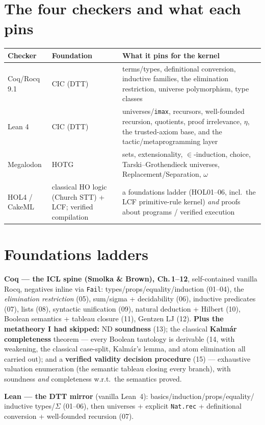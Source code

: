 \documentclass[11pt]{article}
\begin{document}
\section{The four checkers and what each pins}
\begin{center}\small
\begin{tabular}{@{}llp{6.4cm}@{}}
\toprule
Checker & Foundation & What it pins for the kernel \\
\midrule
Coq/Rocq 9.1 & CIC (DTT) & terms/types, definitional conversion, inductive families, the
elimination restriction, universe polymorphism, type classes \\
Lean 4       & CIC (DTT) & universes/\texttt{imax}, recursors, well-founded recursion, quotients,
proof irrelevance, $\eta$, the trusted-axiom base, and the tactic/metaprogramming layer \\
Megalodon    & HOTG & sets, extensionality, $\in$-induction, choice, Tarski--Grothendieck universes,
Replacement/Separation, $\omega$ \\
HOL4 / CakeML & classical HO logic (Church STT) + LCF; verified compilation & a foundations ladder
(HOL01--06, incl.\ the LCF primitive-rule kernel) \emph{and} proofs about programs / verified execution \\
\bottomrule
\end{tabular}
\end{center}

\section{Foundations ladders}
\textbf{Coq --- the ICL spine (Smolka \& Brown), Ch.\,1--12}, self-contained vanilla Rocq, negatives
inline via \texttt{Fail}: types/props/equality/induction (01--04), the \emph{elimination
restriction} (05), sum/sigma + decidability (06), inductive predicates (07), lists (08), syntactic
unification (09), natural deduction + Hilbert (10), Boolean semantics + tableau closure (11), Gentzen
LJ (12). \textbf{Plus the metatheory I had skipped:} ND \textbf{soundness} (13); the classical
\textbf{Kalmár completeness} theorem --- every Boolean tautology is derivable (14, with weakening, the
classical case-split, Kalmár's lemma, and atom elimination all carried out); and a \textbf{verified
validity decision procedure} (15) --- exhaustive valuation enumeration (the semantic tableau closing
every branch), with soundness \emph{and} completeness w.r.t.\ the semantics proved.

\smallskip\noindent\textbf{Lean --- the DTT mirror} (vanilla Lean~4): basics/induction/props/equality/
inductive types/$\Sigma$ (01--06), then universes + explicit \texttt{Nat.rec} + definitional
conversion + well-founded recursion (07).
\end{document}
